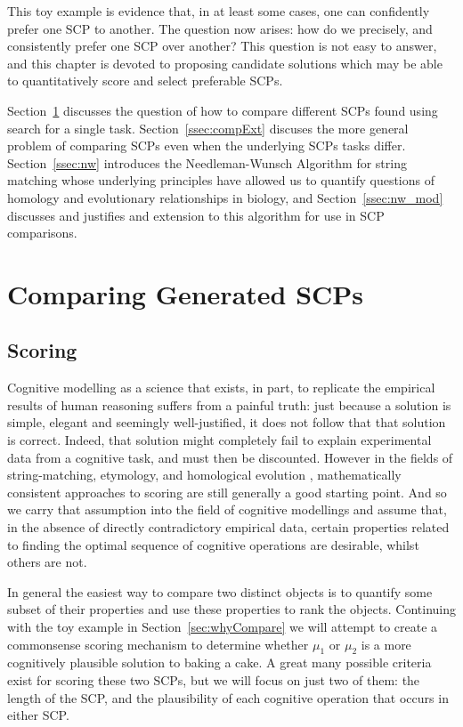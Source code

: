 This toy example is evidence that, in at least some cases, one can confidently prefer one SCP to another. The question now arises: how do we precisely, and consistently prefer one SCP over another? This question is not easy to answer, and this chapter is devoted to proposing candidate solutions which may be able to quantitatively score and select preferable SCPs.

Section~\ref{ssec:compGen} discusses the question of how to compare different SCPs found using search for a single task. Section~\ref{ssec:compExt} discuses the more general problem of comparing SCPs even when the underlying SCPs tasks differ. Section~\ref{ssec:nw} introduces the Needleman-Wunsch Algorithm for string matching whose underlying principles have allowed us to quantify questions of homology and evolutionary relationships in biology, and Section~\ref{ssec:nw_mod} discusses and justifies and extension to this algorithm for use in SCP comparisons.

\section{Comparing Generated SCPs} \label{ssec:compGen}
\subsection{Scoring}
Cognitive modelling as a science that exists, in part, to replicate the empirical results of human reasoning suffers from a painful truth: just because a solution is simple, elegant and seemingly well-justified, it does not follow that that solution is correct. Indeed, that solution might completely fail to explain experimental data from a cognitive task, and must then be discounted. However in the fields of string-matching, etymology, and homological evolution \citep{sweetser1990etymology} \citep{needleman1970general} , mathematically consistent approaches to scoring are still generally a good starting point. And so we carry that assumption into the field of cognitive modellings and assume that, in the absence of directly contradictory empirical data, certain properties related to finding the optimal sequence of cognitive operations are desirable, whilst others are not.

In general the easiest way to compare two distinct objects is to quantify some subset of their properties and use these properties to rank the objects. Continuing with the toy example in Section~\ref{sec:whyCompare} we will attempt to create a commonsense scoring mechanism to determine whether $\mu_1$ or $\mu_2$ is a more cognitively plausible solution to baking a cake. A great many possible criteria exist for scoring these two SCPs, but we will focus on just two of them: the length of the SCP, and the plausibility of each cognitive operation that occurs in either SCP.

